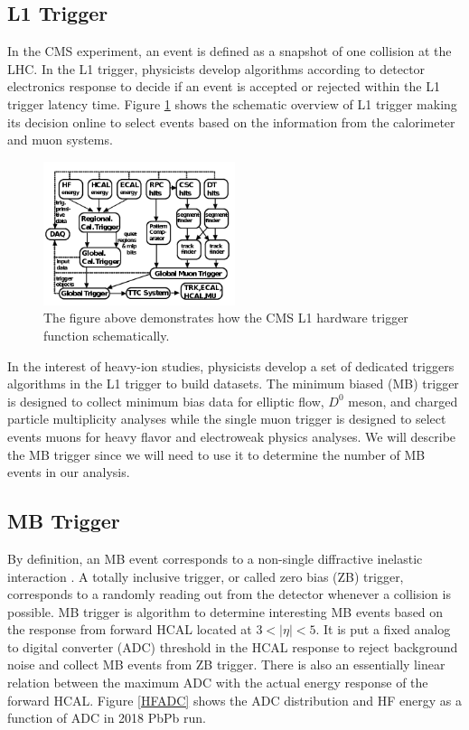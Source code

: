 \subsection{L1 Trigger}

In the CMS experiment, an event is defined as a snapshot of one collision at the LHC. In the L1 trigger, physicists develop algorithms according to detector electronics response to decide if an event is accepted or rejected within the L1 trigger latency time. Figure \ref{L1Overview} shows the schematic overview of L1 trigger making its decision online to select events based on the information from the calorimeter and muon systems.


\begin{figure}[hbtp]
\begin{center}
\includegraphics[width=0.50\textwidth]{Figures/Chapter3/L1Overview.png}
\caption{The figure above demonstrates how the CMS L1 hardware trigger function schematically.}
\label{L1Overview}
\end{center}
\end{figure} 

In the interest of heavy-ion studies, physicists develop a set of dedicated triggers algorithms in the L1 trigger to build datasets. The minimum biased (MB) trigger is designed to collect minimum bias data for elliptic flow, $D^0$ meson, and charged particle multiplicity analyses while the single muon trigger is designed to select events muons for heavy flavor and electroweak physics analyses. We will describe the MB trigger since we will need to use it to determine the number of MB events in our analysis.

\subsection{MB Trigger}

By definition, an MB event corresponds to a non-single diffractive inelastic interaction \cite{MBTrigger}. A totally inclusive trigger, or called zero bias (ZB) trigger, corresponds to a randomly reading out from the detector whenever a collision is possible. MB trigger is algorithm to determine interesting MB events based on the response from forward HCAL located at $3 < |\eta| < 5$. It is put a fixed analog to digital converter (ADC) threshold in the HCAL response to reject background noise and collect MB events from ZB trigger. There is also an essentially linear relation between the maximum ADC with the actual energy response of the forward HCAL. Figure \ref{HFADC} shows the ADC distribution and HF energy as a function of ADC in 2018 PbPb run.

